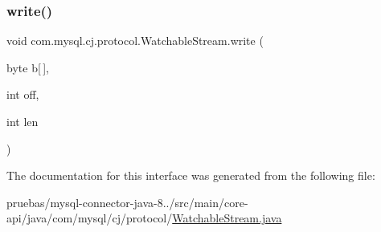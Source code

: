 \mbox{\label{interfacecom_1_1mysql_1_1cj_1_1protocol_1_1_watchable_stream_a266c3021dfaf9c1d9d46ec2c63d83870}} 
\subsubsection{\texorpdfstring{write()}{write()}}
{\footnotesize\ttfamily void com.\+mysql.\+cj.\+protocol.\+Watchable\+Stream.\+write (\begin{DoxyParamCaption}\item[{byte}]{b\mbox{[}$\,$\mbox{]},  }\item[{int}]{off,  }\item[{int}]{len }\end{DoxyParamCaption})}



The documentation for this interface was generated from the following file\+:\begin{DoxyCompactItemize}
\item 
pruebas/mysql-\/connector-\/java-\/8../src/main/core-\/api/java/com/mysql/cj/protocol/\mbox{\hyperlink{_watchable_stream_8java}{Watchable\+Stream.\+java}}\end{DoxyCompactItemize}
